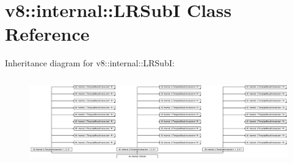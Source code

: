 \hypertarget{classv8_1_1internal_1_1_l_r_sub_i}{}\section{v8\+:\+:internal\+:\+:L\+R\+SubI Class Reference}
\label{classv8_1_1internal_1_1_l_r_sub_i}
Inheritance diagram for v8\+:\+:internal\+:\+:L\+R\+SubI\+:\begin{figure}[H]
\begin{center}
\leavevmode
\includegraphics[height=3.816605cm]{classv8_1_1internal_1_1_l_r_sub_i}
\end{center}
\end{figure}
